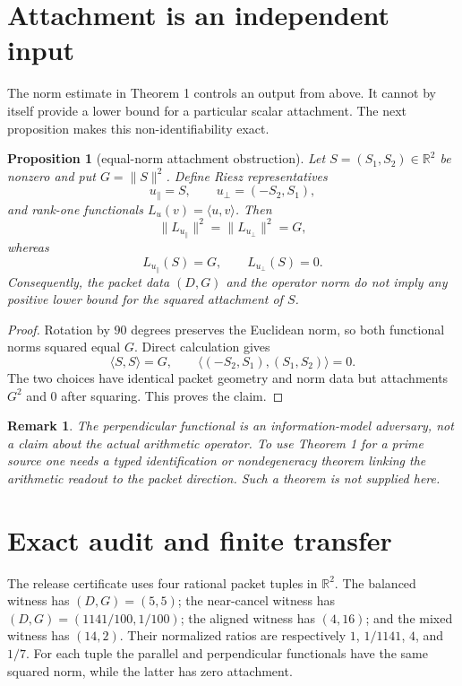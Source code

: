 \documentclass[11pt]{article}
\newtheorem{proposition}[theorem]{Proposition}
\newtheorem{remark}[theorem]{Remark}
\begin{document}
\section{Attachment is an independent input}

The norm estimate in Theorem 1 controls an output from above.  It cannot by
itself provide a lower bound for a particular scalar attachment.  The next
proposition makes this non-identifiability exact.

\begin{proposition}[equal-norm attachment obstruction]
Let $S=(S_1,S_2)\in\mathbb R^2$ be nonzero and put $G=\|S\|^2$.  Define
Riesz representatives
\[
 u_{\parallel}=S,\qquad u_{\perp}=(-S_2,S_1),
\]
and rank-one functionals $L_u(v)=\langle u,v\rangle$.  Then
\[
 \|L_{u_{\parallel}}\|^2=\|L_{u_{\perp}}\|^2=G,
\]
whereas
\[
 L_{u_{\parallel}}(S)=G,\qquad L_{u_{\perp}}(S)=0.
\]
Consequently, the packet data $(D,G)$ and the operator norm do not imply any
positive lower bound for the squared attachment of $S$.
\end{proposition}

\begin{proof}
Rotation by $90$ degrees preserves the Euclidean norm, so both functional
norms squared equal $G$.  Direct calculation gives
\[
 \langle S,S\rangle=G,\qquad
 \langle(-S_2,S_1),(S_1,S_2)\rangle=0.
\]
The two choices have identical packet geometry and norm data but attachments
$G^2$ and $0$ after squaring.  This proves the claim.
\end{proof}

\begin{remark}
The perpendicular functional is an information-model adversary, not a claim
about the actual arithmetic operator.  To use Theorem 1 for a prime source one
needs a typed identification or nondegeneracy theorem linking the arithmetic
readout to the packet direction.  Such a theorem is not supplied here.
\end{remark}

\section{Exact audit and finite transfer}

The release certificate uses four rational packet tuples in $\mathbb R^2$.
The balanced witness has $(D,G)=(5,5)$; the near-cancel witness has
$(D,G)=(1141/100,1/100)$; the aligned witness has $(4,16)$; and the mixed
witness has $(14,2)$.  Their normalized ratios are respectively
$1$, $1/1141$, $4$, and $1/7$.  For each tuple the parallel and perpendicular
functionals have the same squared norm, while the latter has zero attachment.
\end{document}
